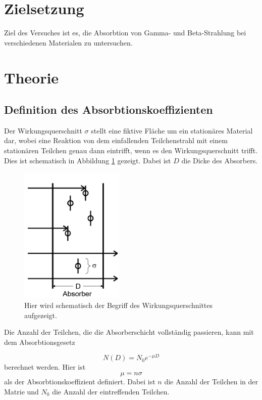 \section{Zielsetzung}
Ziel des Versuches ist es, die Absorbtion von Gamma- und Beta-Strahlung bei verschiedenen Materialen zu untersuchen. 

\section{Theorie}
\label{sec:Theorie}

\subsection{Definition des Absorbtionskoeffizienten}
Der Wirkungsquerschnitt $\sigma$ stellt eine fiktive Fläche um ein stationäres Material dar, wobei eine Reaktion von dem einfallenden Teilchenstrahl mit einem stationären Teilchen genau dann eintrifft,
wenn es den Wirkungsquerschnitt trifft. Dies ist schematisch in Abbildung \ref{fig:WQ} gezeigt. Dabei ist $D$ die Dicke des Absorbers.


\begin{figure}[H]
    \centering
    \includegraphics[width=5cm]{Bilder/WQ.png}
    \caption{Hier wird schematisch der Begriff des Wirkungsquerschnittes aufgezeigt.}
    \label{fig:WQ}
\end{figure}

\noindent Die Anzahl der Teilchen, die die Absorberschicht vollständig passieren, kann mit dem Absorbtionsgesetz

\begin{equation}
    N(D)=N_0 e^{-\mu D}
    \label{eqn:Absorberschicht}
\end{equation}
berechnet werden. 
Hier ist 
\begin{equation}
    \mu = n \sigma 
    \label{eqn:Absorbtionskoeffizient }
\end{equation}  \noindent als der Absorbtionskoeffizient definiert. 
Dabei ist $n$ die Anzahl der Teilchen in der Matrie und $N_0$ die Anzahl der eintreffenden Teilchen.


